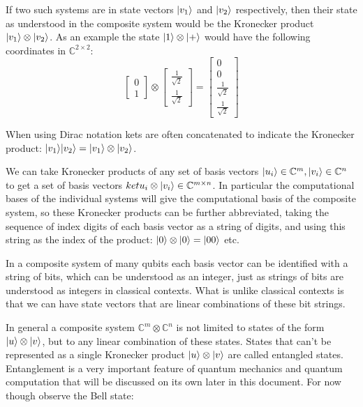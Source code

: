 If two such systems are in state vectors $| v_1 \rangle$ and $| v_2 \rangle$ respectively, then their state as understood in the composite system would be the Kronecker product $| v_1 \rangle \otimes | v_2 \rangle$. As an example the state $| 1 \rangle\otimes| + \rangle$ would have the following coordinates in $\mathbb{C}^{2\times 2}$:
\[
\left[\begin{matrix}0\\1\end{matrix}\right]
\otimes
\left[\begin{matrix}\frac{1}{\sqrt{2}}\\\frac{1}{\sqrt{2}}\end{matrix}\right]
=
\left[\begin{matrix}0\\0\\\frac{1}{\sqrt{2}}\\\frac{1}{\sqrt{2}}\end{matrix}\right]
\]

When using Dirac notation kets are often concatenated to indicate the Kronecker product: $| v_1 \rangle| v_2 \rangle = | v_1 \rangle\otimes| v_2 \rangle$.

We can take Kronecker products of any set of basis vectors $| u_i \rangle \in \mathbb{C}^m, | v_i \rangle \in \mathbb{C}^n$ to get a set of basis vectors $ket{u_i}\otimes| v_i \rangle \in \mathbb{C}^{m\times n}$. In particular the computational bases of the individual systems will give the computational basis of the composite system, so these Kronecker products can be further abbreviated, taking the sequence of index digits of each basis vector as a string of digits, and using this string as the index of the product: $| 0 \rangle\otimes| 0 \rangle = | 00 \rangle$ etc.

In a composite system of many qubits each basis vector can be identified with a string of bits, which can be understood as an integer, just as strings of bits are understood as integers in classical contexts. What is unlike classical contexts is that we can have state vectors that are linear combinations of these bit strings.

In general a composite system $\mathbb{C}^m\otimes\mathbb{C}^n$ is not limited to states of the form $| u \rangle\otimes| v \rangle$, but to any linear combination of these states. States that can't be represented as a single Kronecker product $| u \rangle\otimes| v \rangle$ are called entangled states. Entanglement is a very important feature of quantum mechanics and quantum computation that will be discussed on its own later in this document. For now though observe the Bell state:

